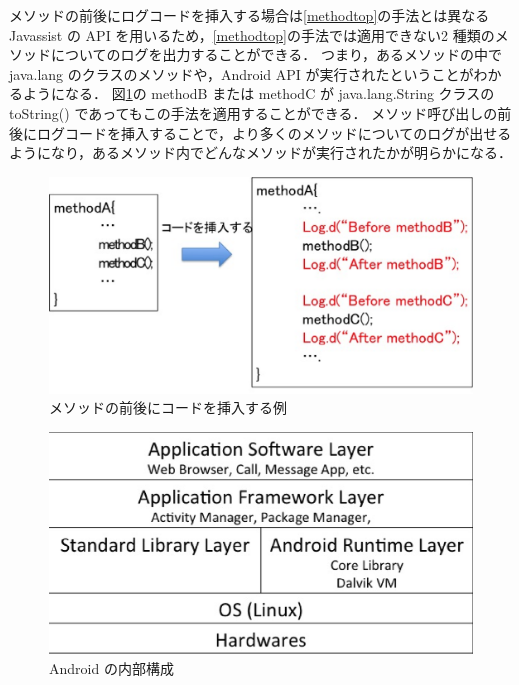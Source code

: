 メソッドの前後にログコードを挿入する場合は\ref{methodtop}の手法とは異なる Javassist の API を用いるため，\ref{methodtop}の手法では適用できない2 種類のメソッドについてのログを出力することができる．
つまり，あるメソッドの中で java.lang のクラスのメソッドや，Android API が実行されたということがわかるようになる．
図\ref{insertbetw}の methodB または methodC が java.lang.String  クラスの toString() であってもこの手法を適用することができる．
メソッド呼び出しの前後にログコードを挿入することで，より多くのメソッドについてのログが出せるようになり，あるメソッド内でどんなメソッドが実行されたかが明らかになる．

\begin{figure}[t]
\begin{center}
\includegraphics[scale=0.35]{image4.eps}
\end{center}
\caption{メソッドの前後にコードを挿入する例}
\label{insertbetw}
\end{figure}

\begin{figure}[t]
\begin{center}
\includegraphics[scale=0.4]{structure2.eps}
\end{center}
\caption{Android の内部構成}
\label{structure}
\end{figure}

